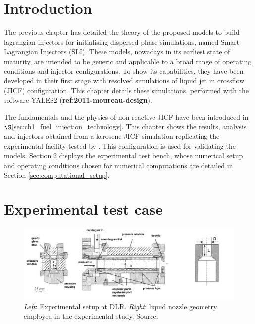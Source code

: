 \newpage 

\section{Introduction}

The previous chapter has detailed the theory of the proposed models to build lagrangian injectors for initialising dispersed phase simulations, named Smart Lagrangian Injectors (SLI). These models, nowadays in its earliest state of maturity, are intended to be generic and applicable to a broad range of operating conditions and injector configurations. To show its capabilities, they have been developed in their first stage with resolved simulations of liquid jet in crossflow (JICF) configuration. This chapter details these simulations, performed with the software YALES2 (\textbf{ref:2011-moureau-design}). %

The fundamentals and the physics of non-reactive JICF have been introduced in $\S$\ref{sec:ch1_fuel_injection_technology}. This chapter shows the results, analysis and injectors obtained from a kerosene JICF simulation replicating the experimental facility tested by . This configuration is used for validating the models. Section \ref{sec:ch5_experimental_bench} displays the experimental test bench, whose numerical setup and operating conditions chosen for numerical computations are detailed in Section \ref{sec:computational_setup}.


\section{Experimental test case}
	\label{sec:ch5_experimental_bench}

\begin{figure}[h!]
	\centering
	\includegraphics[scale=0.5]{./part2_developments/figures_ch5_resolved_JICF/experiment_JICF_DLR}
	\caption{\textsl{Left}: Experimental setup at DLR. \textsl{Right}: liquid nozzle geometry employed in the experimental study. Source: }
	\label{fig:experiment_JICF_DLR}
\end{figure}

